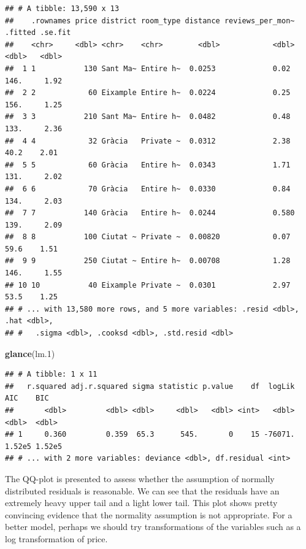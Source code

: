 \documentclass[]{article}
\newenvironment{Shaded}{\begin{snugshade}}{\end{snugshade}}
\newcommand{\FloatTok}[1]{\textcolor[rgb]{0.00,0.00,0.81}{#1}}
\newcommand{\KeywordTok}[1]{\textcolor[rgb]{0.13,0.29,0.53}{\textbf{#1}}}
\newcommand{\NormalTok}[1]{#1}
\begin{document}
\begin{verbatim}
## # A tibble: 13,590 x 13
##    .rownames price district room_type distance reviews_per_mon~ .fitted .se.fit
##    <chr>     <dbl> <chr>    <chr>        <dbl>            <dbl>   <dbl>   <dbl>
##  1 1           130 Sant Ma~ Entire h~  0.0253             0.02    146.     1.92
##  2 2            60 Eixample Entire h~  0.0224             0.25    156.     1.25
##  3 3           210 Sant Ma~ Entire h~  0.0482             0.48    133.     2.36
##  4 4            32 Gràcia   Private ~  0.0312             2.38     40.2    2.01
##  5 5            60 Gràcia   Entire h~  0.0343             1.71    131.     2.02
##  6 6            70 Gràcia   Entire h~  0.0330             0.84    134.     2.03
##  7 7           140 Gràcia   Entire h~  0.0244             0.580   139.     2.09
##  8 8           100 Ciutat ~ Private ~  0.00820            0.07     59.6    1.51
##  9 9           250 Ciutat ~ Entire h~  0.00708            1.28    146.     1.55
## 10 10           40 Eixample Private ~  0.0301             2.97     53.5    1.25
## # ... with 13,580 more rows, and 5 more variables: .resid <dbl>, .hat <dbl>,
## #   .sigma <dbl>, .cooksd <dbl>, .std.resid <dbl>
\end{verbatim}

\begin{Shaded}
\begin{Highlighting}[]
\KeywordTok{glance}\NormalTok{(lm}\FloatTok{.1}\NormalTok{)}
\end{Highlighting}
\end{Shaded}

\begin{verbatim}
## # A tibble: 1 x 11
##   r.squared adj.r.squared sigma statistic p.value    df  logLik    AIC    BIC
##       <dbl>         <dbl> <dbl>     <dbl>   <dbl> <int>   <dbl>  <dbl>  <dbl>
## 1     0.360         0.359  65.3      545.       0    15 -76071. 1.52e5 1.52e5
## # ... with 2 more variables: deviance <dbl>, df.residual <int>
\end{verbatim}

The QQ-plot is presented to assess whether the assumption of normally
distributed residuals is reasonable. We can see that the residuals have
an extremely heavy upper tail and a light lower tail. This plot shows
pretty convincing evidence that the normality assumption is not
appropriate. For a better model, perhaps we should try transformations
of the variables such as a log transformation of price.
\end{document}
